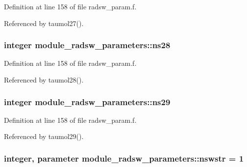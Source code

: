 Definition at line 158 of file radsw\+\_\+param.\+f.



Referenced by taumol27().

\subsubsection[{\texorpdfstring{ns28}{ns28}}]{\setlength{\rightskip}{0pt plus 5cm}integer module\+\_\+radsw\+\_\+parameters\+::ns28}\hypertarget{namespacemodule__radsw__parameters_ac2b720c6b0ab80759cfe83aa53fb4540}{}\label{namespacemodule__radsw__parameters_ac2b720c6b0ab80759cfe83aa53fb4540}


Definition at line 158 of file radsw\+\_\+param.\+f.



Referenced by taumol28().

\subsubsection[{\texorpdfstring{ns29}{ns29}}]{\setlength{\rightskip}{0pt plus 5cm}integer module\+\_\+radsw\+\_\+parameters\+::ns29}\hypertarget{namespacemodule__radsw__parameters_ae966fc99ad683e9e0ee30f792db413fc}{}\label{namespacemodule__radsw__parameters_ae966fc99ad683e9e0ee30f792db413fc}


Definition at line 158 of file radsw\+\_\+param.\+f.



Referenced by taumol29().

\subsubsection[{\texorpdfstring{nswstr}{nswstr}}]{\setlength{\rightskip}{0pt plus 5cm}integer, parameter module\+\_\+radsw\+\_\+parameters\+::nswstr = 1}\hypertarget{namespacemodule__radsw__parameters_a3d4238ce9a40d70a6cdfe241d640ff5f}{}\label{namespacemodule__radsw__parameters_a3d4238ce9a40d70a6cdfe241d640ff5f}


